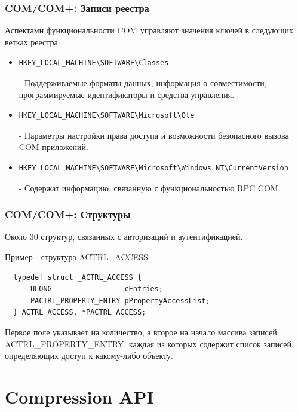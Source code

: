 \documentclass{beamer}
\begin{document}

\begin{frame}[fragile]
\frametitle{COM/COM+: Записи реестра}

Аспектами функциональности COM управляют значения ключей в следующих ветках реестра:
\begin{itemize}
\item { \begin{verbatim}
HKEY_LOCAL_MACHINE\SOFTWARE\Classes
\end{verbatim} - Поддерживаемые форматы данных, информация о совместимости, программируемые идентификаторы и средства управления.}
\item { \begin{verbatim}
HKEY_LOCAL_MACHINE\SOFTWARE\Microsoft\Ole
\end{verbatim} - Параметры настройки права доступа и возможности безопасного вызова COM приложений.}
\item { \begin{verbatim}
HKEY_LOCAL_MACHINE\SOFTWARE\Microsoft\Windows NT\CurrentVersion
\end{verbatim} - Содержат информацию, связанную с функциональностью RPC COM.}
\end{itemize}

\end{frame}


\begin{frame}[fragile]
\frametitle{COM/COM+: Структуры}

Около 30 структур, связанных с авторизаций и аутентификацией.
\medskip

Пример - структура ACTRL\_ACCESS:

\begin{verbatim}
  typedef struct _ACTRL_ACCESS {
      ULONG                 cEntries;
      PACTRL_PROPERTY_ENTRY pPropertyAccessList;
  } ACTRL_ACCESS, *PACTRL_ACCESS;
\end{verbatim}

Первое поле указывает на количество, а второе на начало массива записей ACTRL\_PROPERTY\_ENTRY, каждая из которых содержит список записей, определяющих доступ к какому-либо объекту.

\end{frame}

\section{Compression API}
\end{document}
